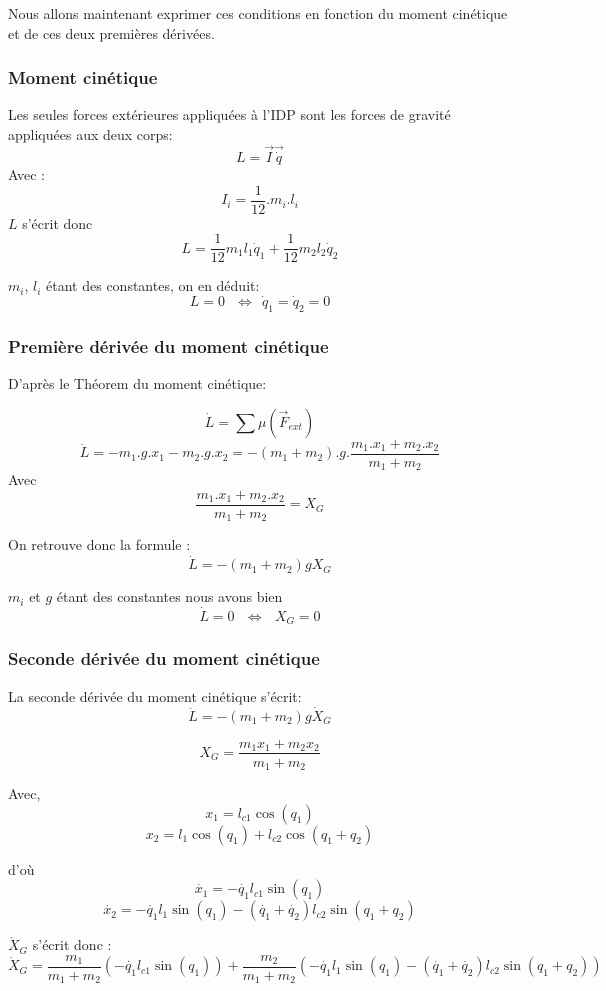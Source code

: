 \documentclass[a4paper,12pt]{report}
\begin{document}
Nous allons maintenant exprimer ces conditions en fonction du moment cinétique et de ces deux premières dérivées.

\subsubsection{Moment cinétique}
Les seules forces extérieures appliquées à l'IDP sont les forces de gravité appliquées aux deux corps:
$$ L = \overrightarrow I \overrightarrow{\dot{q}} $$
Avec : $$I_i = \frac{1}{12}.m_i.l_i$$
$L$ s'écrit donc
$$L = \frac{1}{12} m_1 l_1 \dot{q}_1 + \frac{1}{12} m_2 l_2 \dot{q}_2$$

$m_i$, $l_i$ étant des constantes, on en déduit:
$$ L = 0 \ \ \ \Leftrightarrow \ \ \dot{q}_1 = \dot{q}_2 = 0 $$

\subsubsection{Première dérivée du moment cinétique}


D'après le Théorem du moment cinétique:

$$\dot{L} = \sum{}{\mu(\overrightarrow{F}_{ext})} $$
$$\dot{L} = -m_1.g.x_1 - m_2.g.x_2 = - (m_1 + m_2).g.\frac{m_1.x_1 + m_2.x_2}{m_1 + m_2}$$
Avec $$\frac{m_1.x_1 + m_2.x_2}{m_1 + m_2} = X_G$$


On retrouve donc la formule :
$$\dot{L} = - (m_1 + m_2)g X_G$$

$m_i$ et $g$ étant des constantes nous avons bien
$$\dot{L} = 0 \ \ \ \Leftrightarrow \ \ \ X_G = 0$$

\subsubsection{Seconde dérivée du moment cinétique}
La seconde dérivée du moment cinétique s'écrit:
$$\ddot{L} = - (m_1 + m_2)g \dot{X}_G$$

$$X_G = \frac{m_1 x_1 + m_2 x_2}{m_1 + m_2}$$

Avec,
$$ x_1 = l_{c1} \cos{(q_1)} $$ 
$$ x_2 = l_{1} \cos{(q_1)} + l_{c2} \cos{(q_1 + q_2)} $$

d'où
$$
\dot{x_1} = - \dot{q_1} l_{c1} \sin(q_1)
$$
$$
\dot{x_2} = - \dot{q_1} l_{1} \sin(q_1) - (\dot{q_1} + \dot{q_2}) l_{c2} \sin(q_1 + q_2)
$$

$\dot{X}_G$ s'écrit donc  :
$$\dot{X}_G = \frac{m_1}{m_1 + m_2} (- \dot{q_1} l_{c1} \sin(q_1)) + \frac{m_2}{m_1 + m_2} (- \dot{q_1} l_{1} \sin(q_1) - (\dot{q_1} + \dot{q_2}) l_{c2} \sin(q_1 + q_2))$$
\end{document}
